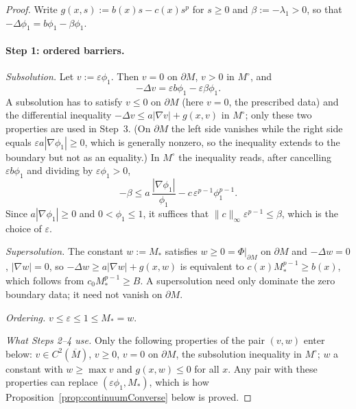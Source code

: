 \documentclass[11pt]{article}
\theoremstyle{plain}
\theoremstyle{definition}
\theoremstyle{remark}
\begin{document}
\begin{proof}
Write \(g(x,s):=b(x)s-c(x)s^p\) for \(s\ge 0\) and \(\beta:=-\lambda_1>0\), so that \(-\Delta\phi_1=b\phi_1-\beta\phi_1\).

\paragraph{Step 1: ordered barriers.}
\emph{Subsolution.} Let \(v:=\varepsilon\phi_1\). Then \(v=0\) on \(\partial M\), \(v>0\) in \(M^\circ\), and
\[
-\Delta v=\varepsilon b\phi_1-\varepsilon\beta\phi_1 .
\]
A subsolution has to satisfy \(v\le 0\) on \(\partial M\) (here \(v=0\), the prescribed data) and the differential inequality \(-\Delta v\le a|\nabla v|+g(x,v)\) in \(M^\circ\); only these two properties are used in Step~3. (On \(\partial M\) the left side vanishes while the right side equals \(\varepsilon a|\nabla\phi_1|\ge 0\), which is generally nonzero, so the inequality extends to the boundary but not as an equality.) In \(M^\circ\) the inequality reads, after cancelling \(\varepsilon b\phi_1\) and dividing by \(\varepsilon\phi_1>0\),
\[
-\beta\le a\,\frac{|\nabla\phi_1|}{\phi_1}-c\,\varepsilon^{p-1}\phi_1^{p-1}.
\]
Since \(a|\nabla\phi_1|\ge 0\) and \(0<\phi_1\le 1\), it suffices that \(\|c\|_\infty\varepsilon^{p-1}\le\beta\), which is the choice of \(\varepsilon\).

\emph{Supersolution.} The constant \(w:=M_\ast\) satisfies \(w\ge 0=\Phi|_{\partial M}\) on \(\partial M\) and \(-\Delta w=0\), \(|\nabla w|=0\), so \(-\Delta w\ge a|\nabla w|+g(x,w)\) is equivalent to \(c(x)M_\ast^{p-1}\ge b(x)\), which follows from \(c_0M_\ast^{p-1}\ge B\). A supersolution need only dominate the zero boundary data; it need not vanish on \(\partial M\).

\emph{Ordering.} \(v\le\varepsilon\le 1\le M_\ast=w\).

\emph{What Steps 2--4 use.} Only the following properties of the pair \((v,w)\) enter below: \(v\in C^2(\overline M)\), \(v\ge 0\), \(v=0\) on \(\partial M\), the subsolution inequality in \(M^\circ\); \(w\) a constant with \(w\ge\max v\) and \(g(x,w)\le 0\) for all \(x\). Any pair with these properties can replace \((\varepsilon\phi_1,M_\ast)\), which is how Proposition~\ref{prop:continuumConverse} below is proved.


\end{proof}
\end{document}
